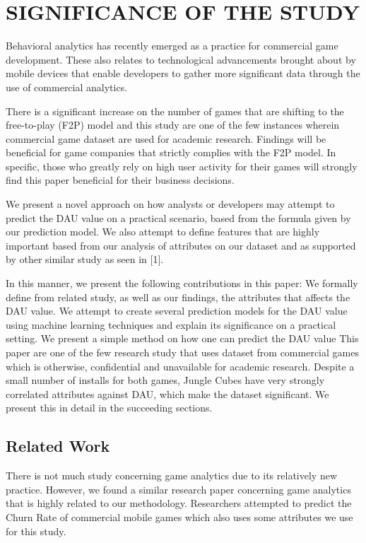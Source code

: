 %
%
%
\section{SIGNIFICANCE OF THE STUDY}
Behavioral analytics has recently emerged as a practice for commercial game development. These also relates to technological advancements brought about by mobile devices that enable developers to gather more significant data through the use of commercial analytics.

There is a significant increase on the number of games that are shifting to the free-to-play (F2P) model and this study are one of the few instances wherein commercial game dataset are used for academic research. Findings will be beneficial for game companies that strictly complies with the F2P model. In specific, those who greatly rely on high user activity for their games will strongly find this paper beneficial for their business decisions.

We present a novel approach on how analysts or developers may attempt to predict the DAU value on a practical scenario, based from the formula given by our prediction model. We also attempt to define features that are highly important based from our analysis of attributes on our dataset and as supported by other similar study as seen in [1].

In this manner, we present the following contributions in this paper:
We formally define from related study, as well as our findings,  the attributes that affects the DAU value.
We attempt to create several prediction models for the DAU value using machine learning techniques and explain its significance on a practical setting.
We present a simple method on how one can predict the DAU value
This paper are one of the few research study that uses dataset from commercial games which is otherwise, confidential and unavailable for academic research.
Despite a small number of installs for both games, Jungle Cubes have very strongly correlated attributes against DAU, which make the dataset significant. We present this in detail in the succeeding sections.

\subsection{Related Work}
There is not much study concerning game analytics due to its relatively new practice. However, we found a similar research paper concerning game analytics that is highly related to our methodology. Researchers attempted to predict the Churn Rate  of commercial mobile games which also uses some attributes we  use for this study.